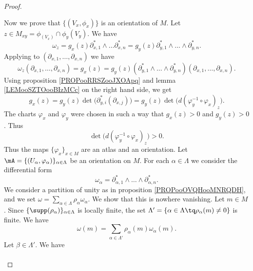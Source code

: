 \begin{proof}
\begin{subproof}
		Now we prove that \( \{ (V_x,\phi_x) \}\) is an orientation of \( M\). Let \( z\in M_{xy}=\phi_(V_x)\cap \phi_y(V_y)\). We have
		\begin{equation}
			\omega_z=g_x(z)\partial_{x,1}^*\wedge\ldots\partial^*_{x,n}=g_y(z)\partial_{y,1}^*\wedge\ldots\wedge\partial_{y,n}^*.
		\end{equation}
		Applying to \( (\partial_{x,1},\ldots,\partial_{x,n})\) we have
		\begin{equation}
			\omega_z(\partial_{x,1},\ldots,\partial_{x,n})=g_x(z)=g_y(z)(\partial_{y,1}^*\wedge\ldots\wedge\partial_{y,n}^*)(\partial_{x,1},\ldots,\partial_{x,n}).
		\end{equation}
		Using proposition \ref{PROPooRRSZooJXOApq} and lemma \ref{LEMooSZTOooBIzMCc} on the right hand side, we get
		\begin{equation}
			g_x(z)=g_y(z)\det\Big( \partial_{y,i}^*(\partial_{x,j}) \Big)=g_y(z)\det\big( d(\varphi_y^{-1}\circ\varphi_x)_z \big).
		\end{equation}
		The charts \( \varphi_x\) and \( \varphi_y\) were chosen in such a way that \( g_x(z)>0\) and \( g_y(z)>0\). Thus
		\begin{equation}
			\det\big( d(\varphi_y^{-1}\circ\varphi_x)_z \big)>0.
		\end{equation}
		Thus the maps \( \{ \varphi_x \}_{x\in M}\) are an atlas and an orientation.
		\spitem[\( \Rightarrow\)]
		Let \( \mA=\{ (U_{\alpha}, \varphi_{\alpha}) \}_{\alpha\in \Lambda}\) be an orientation on \( M\). For each \( \alpha\in \Lambda\) we consider the differential form
		\begin{equation}
			\omega_{\alpha}=\partial_{\alpha,1}^*\wedge\ldots \wedge\partial_{\alpha,n}^*.
		\end{equation}
		We consider a partition of unity as in proposition \ref{PROPooOVQHooMNRQDH}, and we set \( \omega=\sum_{\alpha\in \Lambda}\rho_{\alpha}\omega_{\alpha}\). We show that this is nowhere vanishing. Let \( m\in M\). Since \( \{ \supp(\rho_{\alpha}) \}_{\alpha\in \Lambda}\) is locally finite, the set \( \Lambda'=\{ \alpha\in \Lambda\tq \rho_{\alpha}(m)\neq 0 \}\) is finite. We have
		\begin{equation}
			\omega(m)=\sum_{\alpha\in\Lambda'}\rho_{\alpha}(m)\omega_{\alpha}(m).
		\end{equation}
		Let \( \beta\in \Lambda'\). We have
		\begin{subequations}
			\begin{align}

\end{align}
\end{subequations}
\end{subproof}
\end{proof}
